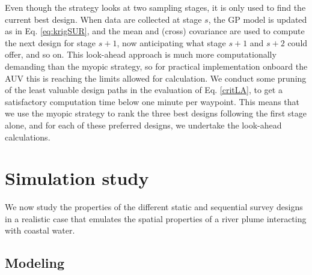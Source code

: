 \documentclass[aoas]{imsart}
\begin{document}
Even though the strategy looks at two sampling stages, it is only used to find
the current best design. When data are collected at stage $s$, the GP model is
updated as in Eq. \eqref{eq:krigSUR}, and the mean and (cross) covariance are
used to compute the next design for stage $s+1$, now anticipating what
stage $s+1$ and $s+2$ could offer, and so on.
This look-ahead approach is much more computationally demanding than
the myopic strategy, so for practical implementation onboard the AUV this is reaching the limits allowed for calculation. We conduct some pruning of the least valuable design paths in the evaluation of Eq. \eqref{critLA}, to get a satisfactory computation time below one minute per waypoint. This means that we use the myopic
strategy to rank the three best designs following the first stage alone, and
for each of these preferred designs, we undertake the look-ahead calculations.

\section{Simulation study}
\label{sec:simulations}

We now study the properties of the different static and sequential
survey designs in a realistic case that emulates the spatial
properties of a river plume interacting with coastal water.

\subsection{Modeling}
\end{document}
